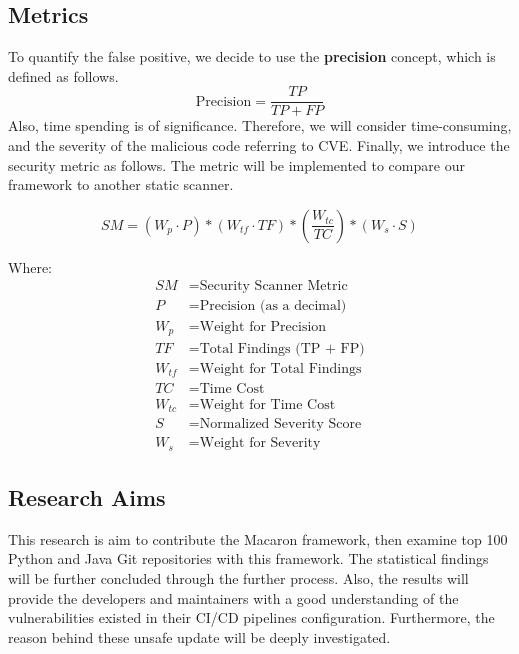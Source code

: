 \subsection{Metrics}
To quantify the false positive, we decide to use the \textbf{precision} concept, which is defined as follows.
\[
    \text{Precision} = \frac{TP}{TP + FP}
\]
Also, time spending is of significance. Therefore, we will consider time-consuming, and the severity of the malicious code 
referring to CVE. Finally, we introduce the security metric as follows. The metric will be implemented to compare our framework
to another static scanner. 


\begin{equation}
    SM = (W_p \cdot P) * (W_{tf} \cdot TF) * (\frac{W_{tc}}{TC}) * (W_s \cdot S)
    \end{equation}
    
Where:
\begin{align*}
SM & = \text{Security Scanner Metric} \\
P & = \text{Precision (as a decimal)} \\
W_p & = \text{Weight for Precision} \\
TF & = \text{Total Findings (TP + FP)} \\
W_{tf} & = \text{Weight for Total Findings} \\
TC & = \text{Time Cost} \\
W_{tc} & = \text{Weight for Time Cost} \\
S & = \text{Normalized Severity Score} \\
W_s & = \text{Weight for Severity}
\end{align*}

\subsection{Research Aims}
This research is aim to contribute the Macaron framework, then examine top 100 Python and Java Git 
repositories with this framework. The statistical findings will be further concluded through the further process.
Also, the results will provide the developers and maintainers with a good understanding 
of the vulnerabilities existed in their CI/CD pipelines configuration. Furthermore, the reason behind
these unsafe update will be deeply investigated.

